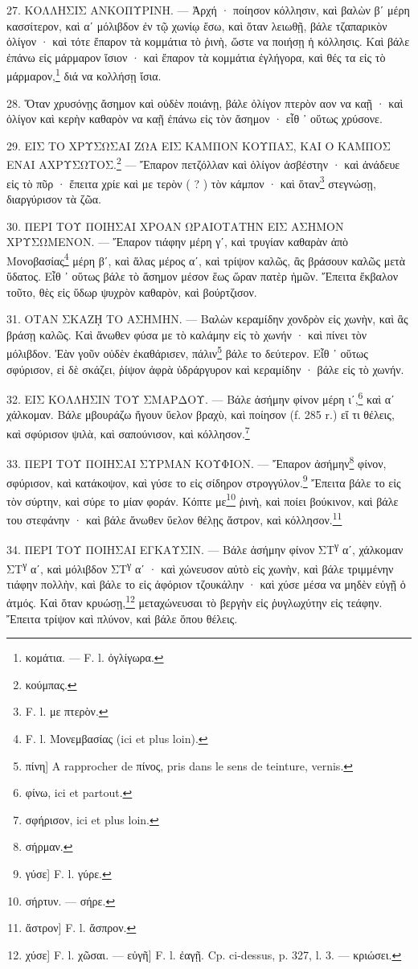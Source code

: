 \documentclass[a4paper, 11pt, oneside, polutonikogreek, french]{article}
\begin{document}
27. ΚΟΛΛΗΣΙΣ ΑΝΚΟΠΥΡΙΝΗ. --- Ἀρχή · ποίησον κόλλησιν, καὶ βαλὼν βʹ μέρη κασσίτερον, καὶ αʹ μόλιβδον ἐν τῷ χωνίῳ ἔσω, καὶ ὅταν λειωθῇ, βάλε τζαπαρικὸν ὀλίγον · καὶ τότε ἔπαρον τὰ κομμάτια τὸ ῥινὴ, ὥστε να ποιήσῃ ἡ κόλλησις. Καὶ βάλε ἐπάνω εἰς μάρμαρον ἴσιον · καὶ ἔπαρον τὰ κομμάτια ἐγλήγορα, καὶ θές τα εἰς τὸ μάρμαρον,\footnote{κομάτια. --- F. l. ὀγλίγωρα.} διά να κολλήσῃ ἴσια.

28. Ὅταν χρυσόνῃς ἄσημον καὶ οὐδὲν ποιάνῃ, βάλε ὀλίγον πτερὸν αον να καῇ · καὶ ὀλίγον καὶ κερὴν καθαρὸν να καῇ ἐπάνω εἰς τὸν ἄσημον · εἶθ ᾽ οὕτως χρύσονε.

29. ΕΙΣ ΤΟ ΧΡΥΣΩΣΑΙ ΖΩΑ ΕΙΣ ΚΑΜΠΟΝ ΚΟΥΠΑΣ, ΚΑΙ Ο ΚΑΜΠΟΣ ΕΝΑΙ ΑΧΡΥΣΩΤΟΣ.\footnote{κούμπας.} --- Ἔπαρον πετζόλλαν καὶ ὀλίγον ἀσβέστην · καὶ ἀνάδευε εἰς τὸ πῦρ · ἔπειτα χρίε καὶ με τερὸν ( ? ) τὸν κάμπον · καὶ ὅταν\footnote{F. l. με πτερὸν.} στεγνώσῃ, διαργύρισον τὰ ζῶα.

30. ΠΕΡΙ ΤΟΥ ΠΟΙΗΣΑΙ ΧΡΟΑΝ ΩΡΑΙΟΤΑΤΗΝ ΕΙΣ ΑΣΗΜΟΝ ΧΡΥΣΩΜΕΝΟΝ. --- Ἔπαρον τιάφην μέρη γʹ, καὶ τρυγίαν καθαρὰν ἀπὸ Μονοβασίας\footnote{F. l. Mονεμβασίας (ici et plus loin).} μέρη βʹ, καὶ ἅλας μέρος αʹ, καὶ τρίψον καλῶς, ἂς βράσουν καλῶς μετὰ ὕδατος. Εἶθ ᾽ οὕτως βάλε τὸ ἄσημον μέσον ἕως ὥραν πατὲρ ἡμῶν. Ἔπειτα ἔκβαλον τοῦτο, θὲς εἰς ὕδωρ ψυχρὸν καθαρὸν, καὶ βούρτζισον.

31. ΟΤΑΝ ΣΚΑΖῌ ΤΟ ΑΣΗΜΗΝ. --- Βαλὼν κεραμίδην χονδρὸν εἰς χωνὴν, καὶ ἂς βράσῃ καλῶς. Καὶ ἄνωθεν φύσα με τὸ καλάμην εἰς τὸ χωνήν · καὶ πίνει τὸν μόλιβδον. Ἐὰν γοῦν οὐδὲν ἐκαθάρισεν, πάλιν\footnote{πίνη] A rapprocher de πίνος, pris dans le sens de teinture, vernis.} βάλε το δεύτερον. Εἶθ ᾽ οὕτως σφύρισον, εἰ δὲ σκάζει, ῥίψον ἀφρὰ ὑδράργυρον καὶ κεραμίδην · βάλε εἰς τὸ χωνήν.

32. ΕΙΣ ΚΟΛΛΗΣΙΝ ΤΟΥ ΣΜΑΡΔΟΥ. --- Βάλε ἀσήμην φίνον μέρη ιʹ,\footnote{φίνω, ici et partout.} καὶ αʹ χάλκομαν. Βάλε μβουράζω ἤγουν ὕελον βραχὺ, καὶ ποίησον (f. 285 r.) εἴ τι θέλεις, καὶ σφύρισον ψιλὰ, καὶ σαπούνισον, καὶ κόλλησον.\footnote{σφήρισον, ici et plus loin.}

33. ΠΕΡΙ ΤΟΥ ΠΟΙΗΣΑΙ ΣΥΡΜΑΝ ΚΟΥΦΙΟΝ. --- Ἔπαρον ἀσήμην\footnote{σήρμαν.} φίνον, σφύρισον, καὶ κατάκοψον, καὶ γύσε το εἰς σίδηρον στρογγύλον.\footnote{γύσε] F. l. γύρε.} Ἔπειτα βάλε το εἰς τὸν σύρτην, καὶ σύρε το μίαν φοράν. Κόπτε με\footnote{σήρτυν. --- σήρε.} ῥινὴ, καὶ ποίει βούκινον, καὶ βάλε του στεφάνην · καὶ βάλε ἄνωθεν ὕελον θέλῃς ἄστρον, καὶ κόλλησον.\footnote{ἄστρον] F. l. ἄσπρον.}

34. ΠΕΡΙ ΤΟΥ ΠΟΙΗΣΑΙ ΕΓΚΑΥΣΙΝ. --- Βάλε ἀσήμην φίνον ΣΤ\textsuperscript{γ} αʹ, χάλκομαν ΣΤ\textsuperscript{γ} αʹ, καὶ μόλιβδον ΣΤ\textsuperscript{γ} αʹ · καὶ χώνευσον αὐτὸ εἰς χωνὴν, καὶ βάλε τριμμένην τιάφην πολλὴν, καὶ βάλε το εἰς ἀφόριον τζουκάλην · καὶ χύσε μέσα να μηδὲν εὐγῇ ὁ ἀτμός. Καὶ ὅταν κρυώσῃ,\footnote{χύσε] F. l. χῶσαι. --- εὐγῆ] F. l. ἐαγῇ. Cp. ci-dessus, p. 327, l. 3. --- κριώσει.} μεταχώνευσαι τὸ βεργὴν εἰς ῥυγλωχύτην εἰς τεάφην. Ἔπειτα τρίψον καὶ πλύνον, καὶ βάλε ὅπου θέλεις.
\end{document}
